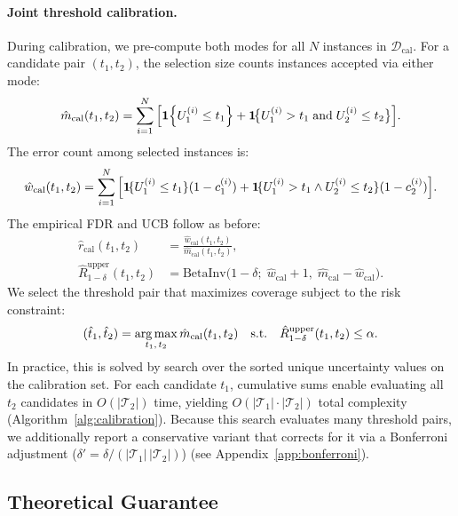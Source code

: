 \paragraph{Joint threshold calibration.}
During calibration, we pre-compute both modes for all $N$ instances in $\mathcal{D}_{\mathrm{cal}}$. For a candidate pair $(t_1, t_2)$, the selection size counts instances accepted via either mode:
\begin{equation}
\label{eq:mcal_route}
  \hat{m}_{\mathrm{cal}}(t_1, t_2) = \sum_{i=1}^{N} \Big[\mathbf{1}\!\left\{U_1^{(i)} \leq t_1\right\} + \mathbf{1}\!\big\{U_1^{(i)} > t_1 \;\text{and}\; U_2^{(i)} \leq t_2\big\}\Big].
\end{equation}
The error count among selected instances is:
\begin{equation}
\label{eq:wcal_route}
  \hat{w}_{\mathrm{cal}}(t_1, t_2) = \sum_{i=1}^{N} \Big[\mathbf{1}\!\{U_1^{(i)} \leq t_1\}(1 - c_1^{(i)}) + \mathbf{1}\!\{U_1^{(i)} > t_1 \wedge U_2^{(i)} \leq t_2\}(1 - c_2^{(i)})\Big].
\end{equation}
The empirical FDR and UCB follow as before:
\begin{align}
  \hat{r}_{\mathrm{cal}}(t_1, t_2) &= \frac{\hat{w}_{\mathrm{cal}}(t_1, t_2)}{\hat{m}_{\mathrm{cal}}(t_1, t_2)}, \label{eq:fdr_route} \\[4pt]
  \hat{R}^{\mathrm{upper}}_{1-\delta}(t_1, t_2) &= \mathrm{BetaInv}\!\big(1 - \delta;\; \hat{w}_{\mathrm{cal}} + 1,\; \hat{m}_{\mathrm{cal}} - \hat{w}_{\mathrm{cal}}\big). \label{eq:ucb_route}
\end{align}
We select the threshold pair that maximizes coverage subject to the risk constraint:
\begin{equation}
\label{eq:that_route}
  (\hat{t}_1, \hat{t}_2) = \operatorname*{arg\,max}_{t_1,\, t_2} \hat{m}_{\mathrm{cal}}(t_1, t_2) \quad \text{s.t.} \quad \hat{R}^{\mathrm{upper}}_{1-\delta}(t_1, t_2) \leq \alpha.
\end{equation}
In practice, this is solved by search over the sorted unique uncertainty values on the calibration set. For each candidate $t_1$, cumulative sums enable evaluating all $t_2$ candidates in $O(|\mathcal{T}_2|)$ time, yielding $O(|\mathcal{T}_1| \cdot |\mathcal{T}_2|)$ total complexity (Algorithm~\ref{alg:calibration}). Because this search evaluates many threshold pairs, we additionally report a conservative variant that corrects for it via a Bonferroni adjustment ($\delta' = \delta/(|\mathcal{T}_1|\,|\mathcal{T}_2|)$) (see Appendix~\ref{app:bonferroni}).

\subsection{Theoretical Guarantee}
\label{sec:guarantee}


